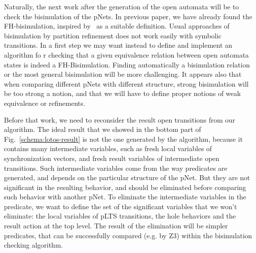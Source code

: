 \documentclass{lncs/llncs}
\begin{document}
Naturally, the next work after the generation of the open automata
will be to check the bisimulation of the pNets. In previous paper, we
have already found the FH-bisimulation, inspired by~\cite{deSimone85} as a
suitable definition. Usual approaches of bisimulation by partition
refinement does not work easily with symbolic transitions. In a first
step we may want instead to define and implement an algorithm fo
r checking that a given equivalence relation between open automata
states is indeed a FH-Bisimulation. Finding automatically a
bisimulation relation or the most general bisimulation will be more
challenging. It appears also that when comparing different pNets with
different structure, strong bisimulation will be too strong a notion,
and that we will have to define proper notions of weak equivalence or
refinements. 

Before that work, we need to reconsider the result open transitions
from our algorithm. The ideal
result that we showed in the bottom part of
Fig.~\ref{schema:lotos-result} is not the one generated by the algorithm,
because it contains many intermediate
variables, such as fresh local variables of synchronization
vectors, and fresh result variables of intermediate open transitions.
Such intermediate variables come from the way predicates are
generated, and depends on the particular structure of the pNet. But
they are not significant in the resulting behavior, and should be
eliminated before comparing such behavior with another pNet.
To eliminate the intermediate variables in the predicate, we want to define
the set of the significant variables that we won't eliminate: the
local variables of pLTS transitions, the hole behaviors and the result
action at the top level.
The result of the elimination will be simpler predicates, that can be
successfully compared (e.g. by Z3) within the bisimulation checking
algorithm.





% 


\end{document}
